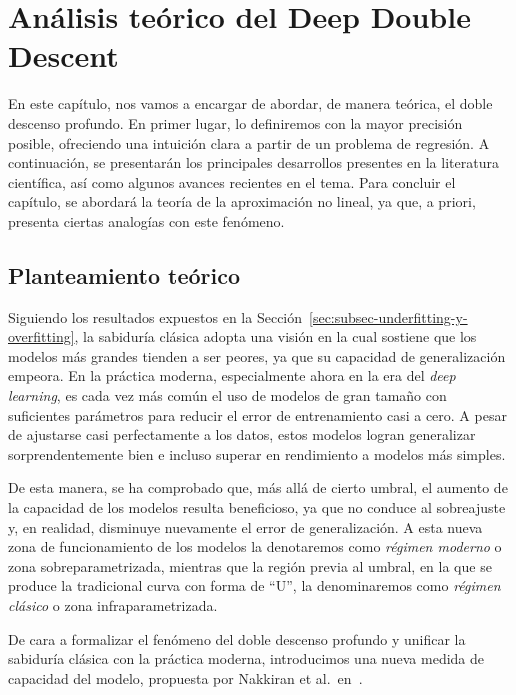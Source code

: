 
\chapter{Análisis teórico del Deep Double Descent}\label{ch:analisis-teorico-ddd}

En este capítulo, nos vamos a encargar de abordar, de manera teórica, el doble descenso profundo. En primer lugar, lo definiremos con la mayor precisión posible, ofreciendo una intuición clara a partir de un problema de regresión. A continuación, se presentarán los principales desarrollos presentes en la literatura científica, así como algunos avances recientes en el tema. Para concluir el capítulo, se abordará la teoría de la aproximación no lineal, ya que, a priori, presenta ciertas analogías con este fenómeno.\newline

\section{Planteamiento teórico}\label{sec:planteamiento-teorico}

Siguiendo los resultados expuestos en la Sección~\ref{sec:subsec-underfitting-y-overfitting}, la sabiduría clásica adopta una visión en la cual sostiene que los modelos más grandes tienden a ser peores, ya que su capacidad de generalización empeora. En la práctica moderna, especialmente ahora en la era del \textit{deep learning}, es cada vez más común el uso de modelos de gran tamaño con suficientes parámetros para reducir el error de entrenamiento casi a cero. A pesar de ajustarse casi perfectamente a los datos, estos modelos logran generalizar sorprendentemente bien e incluso superar en rendimiento a modelos más simples.\newline

De esta manera, se ha comprobado que, más allá de cierto umbral, el aumento de la capacidad de los modelos resulta beneficioso, ya que no conduce al sobreajuste y, en realidad, disminuye nuevamente el error de generalización. A esta nueva zona de funcionamiento de los modelos la denotaremos como \emph{régimen moderno} o zona sobreparametrizada, mientras que la región previa al umbral, en la que se produce la tradicional curva con forma de ``U'', la denominaremos como \textit{régimen clásico} o zona infraparametrizada.\newline

De cara a formalizar el fenómeno del doble descenso profundo y unificar la sabiduría clásica con la práctica moderna, introducimos una nueva medida de capacidad del modelo, propuesta por Nakkiran et al.\ en~\cite{Nakkiran2019}.

